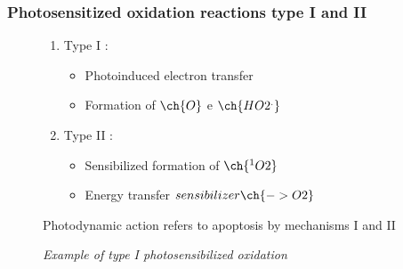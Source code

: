 \documentclass[aspectratio=169,fleqn,table]{beamer}
\begin{document}
\begingroup
{}
\begin{frame}
\frametitle{Photosensitized oxidation reactions type I and II}

\begin{figure}
\centering
\begin{minipage}[border=15pt]{0.46\textwidth}
	\centering
	\vspace{-175pt}
    \begin{enumerate}
        \item
        Type I :
        \begin{itemize}
            \item
            Photoinduced electron transfer
            \item
            Formation of $\ch{O}$ e $\ch{HO2^.}$
        \end{itemize}
        \item
        Type II :
        \begin{itemize}
            \item
            Sensibilized formation of $\ch{^1O2}$
            \item
            Energy transfer $sensibilizer\ch{-> O2}$
        \end{itemize}
    \end{enumerate}
    \vspace{-10pt}
    \begin{pdtypes}
        Photodynamic action refers to apoptosis by mechanisms I and II
    \end{pdtypes}
\end{minipage}
\hfill
\begin{minipage}[b]{0.5\textwidth}
	\centering
	\vspace{-10pt}
    \vspace{-5pt}
    \caption {%
    \textit{Example of type I photosensibilized oxidation}}
\end{minipage}
\end{figure}

\end{frame}
\endgroup


\end{document}
